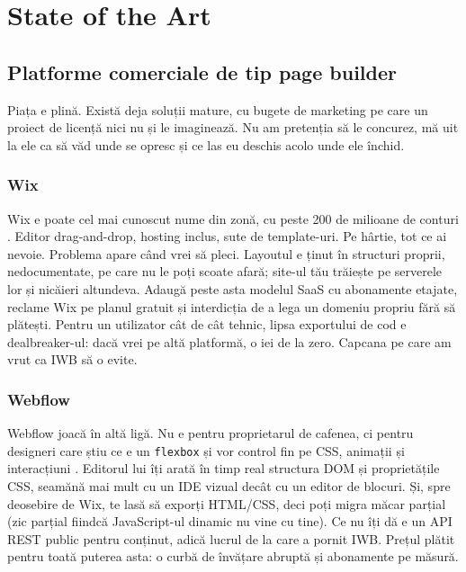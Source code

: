 \documentclass[12pt,a4paper]{report}
\begin{document}
\chapter{State of the Art}

\section{Platforme comerciale de tip page builder}

Piața e plină. Există deja soluții mature, cu bugete de marketing pe care un proiect
de licență nici nu și le imaginează. Nu am pretenția să le concurez, mă uit la ele
ca să văd unde se opresc și ce las eu deschis acolo unde ele închid.

\subsection{Wix}

Wix e poate cel mai cunoscut nume din zonă, cu peste 200 de milioane de conturi
\cite{wixwebsite}. Editor drag-and-drop, hosting inclus, sute de template-uri. Pe
hârtie, tot ce ai nevoie. Problema apare când vrei să pleci. Layoutul e ținut în
structuri proprii, nedocumentate, pe care nu le poți scoate afară; site-ul tău
trăiește pe serverele lor și nicăieri altundeva. Adaugă peste asta modelul SaaS cu
abonamente etajate, reclame Wix pe planul gratuit și interdicția de a lega un domeniu
propriu fără să plătești. Pentru un utilizator cât de cât tehnic, lipsa exportului de
cod e dealbreaker-ul: dacă vrei pe altă platformă, o iei de la zero. Capcana pe
care am vrut ca IWB să o evite.

\subsection{Webflow}

Webflow joacă în altă ligă. Nu e pentru proprietarul de cafenea, ci pentru designeri
care știu ce e un \texttt{flexbox} și vor control fin pe CSS, animații și interacțiuni
\cite{webflowsite}. Editorul lui îți arată în timp real structura DOM și proprietățile
CSS, seamănă mai mult cu un IDE vizual decât cu un editor de blocuri. Și, spre
deosebire de Wix, te lasă să exporți HTML/CSS, deci poți migra măcar parțial (zic
parțial fiindcă JavaScript-ul dinamic nu vine cu tine). Ce nu îți dă e un API REST
public pentru conținut, adică lucrul de la care a pornit IWB. Prețul plătit
pentru toată puterea asta: o curbă de învățare abruptă și abonamente pe măsură.
\end{document}
